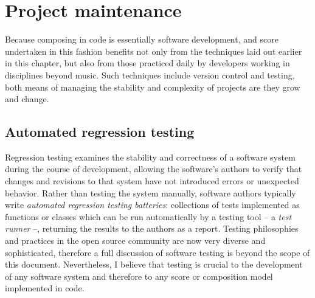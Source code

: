 \section{Project maintenance}
\label{sec:project-maintenance}

Because composing in code is essentially software development, and score
undertaken in this fashion benefits not only from the techniques laid out
earlier in this chapter, but also from those practiced daily by developers
working in disciplines beyond music. Such techniques include version control
and testing, both means of managing the stability and complexity of projects
are they grow and change.

\subsection{Automated regression testing}
\label{ssec:testing}


Regression testing\cite{beazley2013python} examines the stability and
correctness of a software system during the course of development, allowing the
software's authors to verify that changes and revisions to that system have not
introduced errors or unexpected behavior. Rather than testing the system
manually, software authors typically write \emph{automated regression testing
batteries}: collections of tests implemented as functions or classes which can
be run automatically by a testing tool -- a \emph{test runner} --, returning
the results to the authors as a report. Testing philosophies and practices in
the open source community are now very diverse and sophisticated, therefore a
full discussion of software testing is beyond the scope of this document.
Nevertheless, I believe that testing is crucial to the development of any
software system and therefore to any score or composition model implemented in
code.

